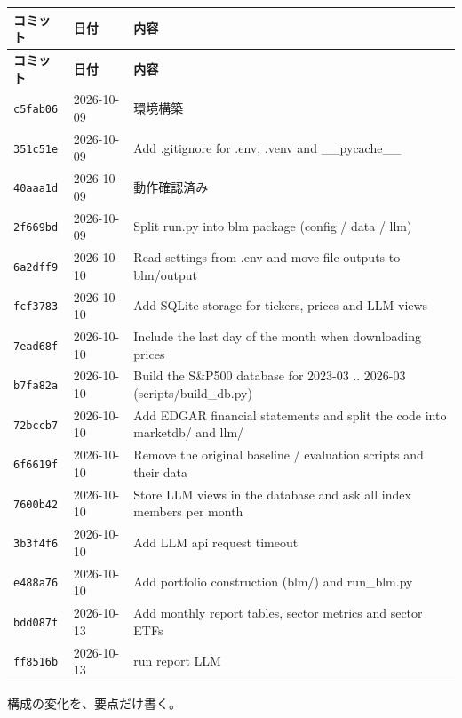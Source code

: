 \documentclass[xelatex,ja=standard,jafont=hiragino-pron,a4paper,10pt]{bxjsreport}
\begin{document}
{\footnotesize
\begin{longtable}{llp{10.50cm}}
\toprule
\textbf{コミット} & \textbf{日付} & \textbf{内容} \\
\midrule
\endfirsthead
\toprule
\textbf{コミット} & \textbf{日付} & \textbf{内容} \\
\midrule
\endhead
\bottomrule
\endfoot
\texttt{c5fab06} & 2026-10-09 & 環境構築 \\
\texttt{351c51e} & 2026-10-09 & Add .gitignore for .env, .venv and \_\_pycache\_\_ \\
\texttt{40aaa1d} & 2026-10-09 & 動作確認済み \\
\texttt{2f669bd} & 2026-10-09 & Split run.py into blm package (config / data / llm) \\
\texttt{6a2dff9} & 2026-10-10 & Read settings from .env and move file outputs to blm/output \\
\texttt{fcf3783} & 2026-10-10 & Add SQLite storage for tickers, prices and LLM views \\
\texttt{7ead68f} & 2026-10-10 & Include the last day of the month when downloading prices \\
\texttt{b7fa82a} & 2026-10-10 & Build the S\&P500 database for 2023-03 .. 2026-03 (scripts/build\_db.py) \\
\texttt{72bccb7} & 2026-10-10 & Add EDGAR financial statements and split the code into marketdb/ and llm/ \\
\texttt{6f6619f} & 2026-10-10 & Remove the original baseline / evaluation scripts and their data \\
\texttt{7600b42} & 2026-10-10 & Store LLM views in the database and ask all index members per month \\
\texttt{3b3f4f6} & 2026-10-10 & Add LLM api request timeout \\
\texttt{e488a76} & 2026-10-10 & Add portfolio construction (blm/) and run\_blm.py \\
\texttt{bdd087f} & 2026-10-13 & Add monthly report tables, sector metrics and sector ETFs \\
\texttt{ff8516b} & 2026-10-13 & run report LLM \\
\end{longtable}
}

構成の変化を、要点だけ書く。
\end{document}
